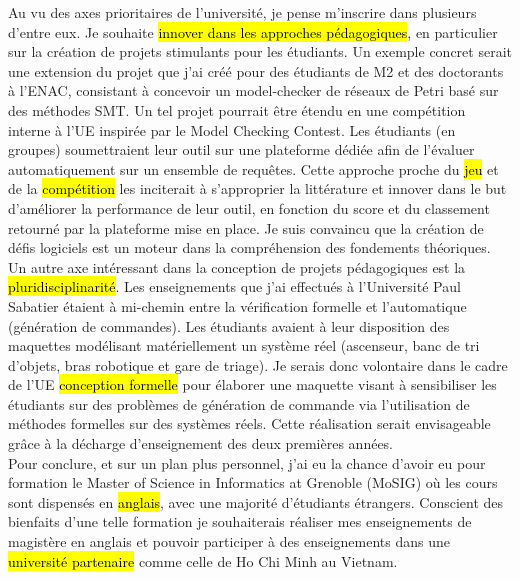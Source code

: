 Au vu des axes prioritaires de l'université, je pense m'inscrire dans plusieurs
d'entre eux. Je souhaite \hl{innover dans les approches pédagogiques}, en
particulier sur la création de projets stimulants pour les étudiants. Un exemple
concret serait une extension du projet que j'ai créé pour des étudiants de M2 et
des doctorants à l'ENAC, consistant à concevoir un model-checker de réseaux de
Petri basé sur des méthodes SMT. Un tel projet pourrait être étendu en une
compétition interne à l'UE inspirée par le Model Checking Contest. Les étudiants
(en groupes) soumettraient leur outil sur une plateforme dédiée afin de
l'évaluer automatiquement sur un ensemble de requêtes. Cette approche proche du
\hl{jeu} et de la \hl{compétition} les inciterait à s'approprier la littérature et
innover dans le but d'améliorer la performance de leur outil, en fonction du
score et du classement retourné par la plateforme mise en place. Je suis
convaincu que la création de défis logiciels est un moteur dans la
compréhension des fondements théoriques.\\


Un autre axe intéressant dans la conception de projets pédagogiques est la
\hl{pluridisciplinarité}. Les enseignements que j'ai effectués à l'Université
Paul Sabatier étaient à mi-chemin entre la vérification formelle et
l'automatique (génération de commandes). Les étudiants avaient à leur
disposition des maquettes modélisant matériellement un système réel (ascenseur,
banc de tri d'objets, bras robotique et gare de triage). Je serais donc
volontaire dans le cadre de l'UE \og \hl{conception formelle} \fg pour élaborer
une maquette visant à sensibiliser les étudiants sur des problèmes de génération
de commande via l'utilisation de méthodes formelles sur des systèmes réels.
Cette réalisation serait envisageable grâce à la décharge d'enseignement des
deux premières années.\\

Pour conclure, et sur un plan plus personnel, j'ai eu la chance d'avoir eu pour
formation le Master of Science in Informatics at Grenoble (MoSIG) où les cours
sont dispensés en \hl{anglais}, avec une majorité d'étudiants étrangers.
Conscient des bienfaits d'une telle formation je souhaiterais réaliser mes
enseignements de magistère en anglais et pouvoir participer à des enseignements
dans une \hl{université partenaire} comme celle de Ho Chi Minh au Vietnam.
